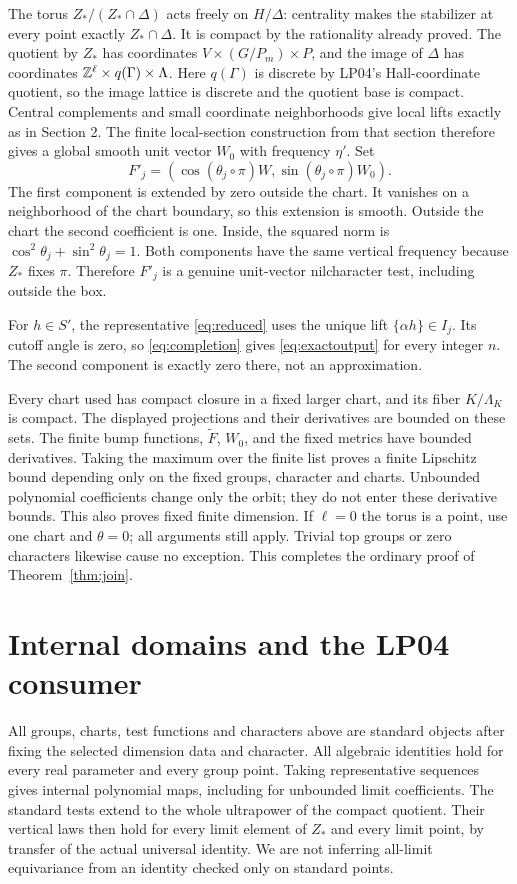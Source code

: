 \documentclass[11pt]{article}
\begin{document}
The torus $Z_* /(Z_*\cap\Delta)$ acts freely on $H/\Delta$:
centrality makes the stabilizer at every point exactly
$Z_*\cap\Delta$. It is compact by the rationality already proved.
The quotient by $Z_*$ has coordinates $V\times(G/P_m)\times P$,
and the image of $\Delta$ has coordinates
$\mathbb Z^\ell\times q(\Gamma)\times\Lambda$. Here $q(\Gamma)$ is
discrete by LP04's Hall-coordinate quotient, so the image lattice is
discrete and the quotient base is compact. Central complements and small
coordinate neighborhoods give local lifts exactly as in Section 2.
The finite local-section construction from that section therefore gives a
global smooth unit vector $W_0$ with frequency $\eta'$. Set
\begin{equation}\label{eq:completion}
 F'_j=(\cos(\theta_j\circ\pi)W,
                 \sin(\theta_j\circ\pi)W_0).
\end{equation}
The first component is extended by zero outside the chart. It vanishes
on a neighborhood of the chart boundary, so this extension is smooth.
Outside the chart the second coefficient is one. Inside, the squared
norm is $\cos^2\theta_j+\sin^2\theta_j=1$. Both components have the
same vertical frequency because $Z_*$ fixes $\pi$. Therefore $F'_j$
is a genuine unit-vector nilcharacter test, including outside the box.

For $h\in S'$, the representative \eqref{eq:reduced} uses the unique
lift $\{\alpha h\}\in I_j$. Its cutoff angle is zero, so
\eqref{eq:completion} gives \eqref{eq:exactoutput} for every integer $n$.
The second component is exactly zero there, not an approximation.

Every chart used has compact closure in a fixed larger chart, and its
fiber $K/\Lambda_K$ is compact. The displayed projections and their
derivatives are bounded on these sets. The finite bump functions,
$\widetilde F$, $W_0$, and the fixed metrics have bounded derivatives.
Taking the maximum over the finite list proves a finite Lipschitz bound
depending only on the fixed groups, character and charts. Unbounded
polynomial coefficients change only the orbit; they do not enter these
derivative bounds. This also proves fixed finite dimension. If $\ell=0$
the torus is a point, use one chart and $\theta=0$; all arguments still
apply. Trivial top groups or zero characters likewise cause no exception.
This completes the ordinary proof of Theorem~\ref{thm:join}.

\section{Internal domains and the LP04 consumer}
All groups, charts, test functions and characters above are standard
objects after fixing the selected dimension data and character. All
algebraic identities hold for every real parameter and every group point.
Taking representative sequences gives internal polynomial maps, including
for unbounded limit coefficients. The standard tests extend to the whole
ultrapower of the compact quotient. Their vertical laws then hold for
every limit element of $Z_*$ and every limit point, by transfer of the
actual universal identity. We are not inferring all-limit equivariance
from an identity checked only on standard points.
\end{document}
